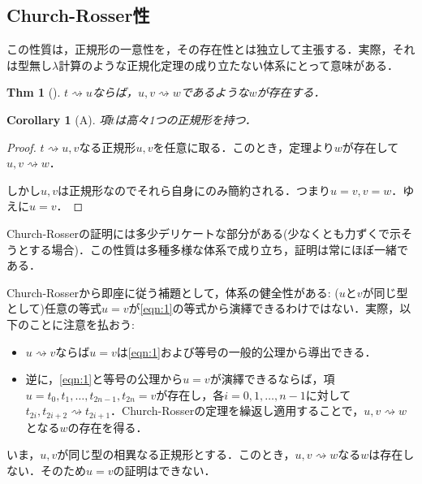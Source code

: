 \documentclass[a4paper,10pt,platex, dvipdfmx]{jsarticle}
\newtheorem{thm}{Thm}
\newtheorem{corollary}{Corollary}
\begin{document}
\subsection{Church-Rosser性}
この性質は，正規形の一意性を，その存在性とは独立して主張する．実際，それは型無し$\lambda$計算のような正規化定理の成り立たない体系にとって意味がある．
\begin{thm}[]
    $t\rightsquigarrow u$ならば，$u, v\rightsquigarrow w$であるような$w$が存在する．
\end{thm}
\begin{figure}[H]
    \centering
{}
\end{figure}
\begin{corollary}[A]
    項$t$は高々1つの正規形を持つ．
\end{corollary}
\begin{proof}
    $t \rightsquigarrow u ,v$なる正規形$u, v$を任意に取る．このとき，定理より$w$が存在して$u, v\rightsquigarrow w$．

    しかし$u, v$は正規形なのでそれら自身にのみ簡約される．つまり$u = v, v = w$．ゆえに$u = v$．
\end{proof}
Church-Rosserの証明には多少デリケートな部分がある(少なくとも力ずくで示そうとする場合)．この性質は多種多様な体系で成り立ち，証明は常にほぼ一緒である．

Church-Rosserから即座に従う補題として，体系の健全性がある: ($u$と$v$が同じ型として)任意の等式$u = v$が\ref{eqn:1}の等式から演繹できるわけではない．実際，以下のことに注意を払おう:\begin{itemize}
\item $u\rightsquigarrow    v$ならば$u = v$は\ref{eqn:1}および等号の一般的公理から導出できる．
\item 逆に，\ref{eqn:1}と等号の公理から$u =v$が演繹できるならば，項$u = t_{0},t_{1},\ldots ,t_{2n - 1}, t_{2n} = v$が存在し，各$i = 0, 1, \ldots , n - 1$に対して$t_{2i}, t_{2i+2}\rightsquigarrow t_{2i+1}$．Church-Rosserの定理を繰返し適用することで，$u ,v\rightsquigarrow w$となる$w$の存在を得る．
\end{itemize}
いま，$u,v$が同じ型の相異なる正規形とする．このとき，$u, v\rightsquigarrow w$なる$w$は存在しない．そのため$u = v$の証明はできない．
\end{document}

